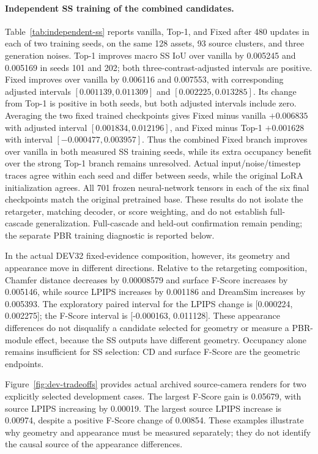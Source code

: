 \documentclass[10pt]{article}
\begin{document}
\paragraph{Independent SS training of the combined candidates.}
Table~\ref{tab:independent-ss} reports vanilla, Top-1, and Fixed after
480 updates in each of two training seeds, on the same 128 assets,
93 source clusters, and three generation noises. Top-1 improves macro
SS IoU over vanilla by 0.005245 and 0.005169 in seeds 101 and 202;
both three-contrast-adjusted intervals are positive. Fixed improves over
vanilla by 0.006116 and 0.007553, with corresponding adjusted intervals
$[0.001139,0.011309]$ and $[0.002225,0.013285]$.
Its change from Top-1 is positive in both seeds, but both adjusted
intervals include zero. Averaging the two fixed trained checkpoints gives
Fixed minus vanilla $+0.006835$ with adjusted interval
$[0.001834,0.012196]$, and Fixed minus Top-1 $+0.001628$ with interval
$[-0.000477,0.003957]$. Thus the combined Fixed branch improves over vanilla
in both measured SS training seeds, while its extra occupancy benefit over
the strong Top-1 branch remains unresolved.
Actual input/noise/timestep traces agree within each seed and differ between
seeds, while the original LoRA initialization agrees. All 701 frozen
neural-network tensors in each of the six final checkpoints match the
original pretrained base. These results do not isolate the retargeter,
matching decoder, or score weighting, and do not establish full-cascade
generalization. Full-cascade and held-out confirmation remain pending;
the separate PBR training diagnostic is reported below.


In the actual DEV32 fixed-evidence composition, however,
its geometry and appearance move in different directions. Relative to the
retargeting composition, Chamfer distance decreases by 0.00008579 and surface
F-Score increases by 0.005146, while source LPIPS increases by 0.001186 and
DreamSim increases by 0.005393. The exploratory paired interval for the LPIPS
change is [0.000224, 0.002275]; the F-Score interval is
[-0.000163, 0.011128]. These appearance differences do not disqualify a
candidate selected for geometry or measure a PBR-module effect, because
the SS outputs have different geometry. Occupancy alone remains insufficient
for SS selection: CD and surface F-Score are the geometric endpoints.

Figure~\ref{fig:dev-tradeoffs} provides actual archived source-camera renders
for two explicitly selected development cases. The largest F-Score gain is
0.05679, with source LPIPS increasing by 0.00019. The largest source LPIPS
increase is 0.00974, despite a positive F-Score change of 0.00854. These
examples illustrate why geometry and appearance must be measured separately;
they do not identify the causal source of the appearance differences.

\end{document}
